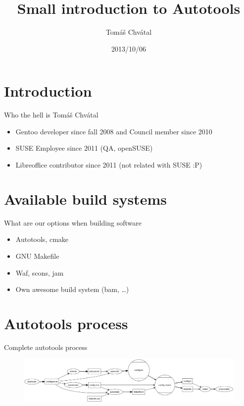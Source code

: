 \documentclass{beamer}
\author{Tom\'{a}\v{s} Chv\'{a}tal\newline {\small openSUSE Team}}
\title{Small introduction to Autotools}
\date{2013/10/06}
\begin{document}
\begin{frame}[t,plain]
\titlepage
\end{frame}

\section{Introduction}

\begin{frame}[t]{Who the hell is Tomáš Chvátal}
    \begin{itemize}
    \item Gentoo developer since fall 2008 and Council member since 2010
    \item SUSE Employee since 2011 (QA, openSUSE)
    \item Libreoffice contributor since 2011 (not related with SUSE :P)
    \end{itemize}
\end{frame}

\section{Available build systems}

\begin{frame}{What are our options when building software}
    \begin{itemize}
    \item Autotools, cmake
    \item GNU Makefile
    \item Waf, scons, jam
    \item Own awesome build system (bam, \ldots)
    \end{itemize}
\end{frame}

\section{Autotools process}

\begin{frame}{Complete autotools process}
    \begin{figure}
    \includegraphics[width= 1.0\linewidth]{autotools.png}
    \end{figure}
\end{frame}
\end{document}
